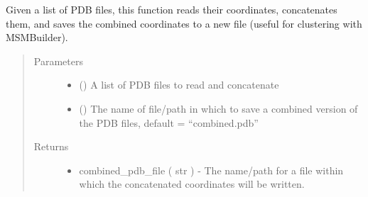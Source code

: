 \documentclass[letterpaper,12pt,english,openany,oneside]{sphinxmanual}
\begin{document}
\begin{fulllineitems}
\label{\detokenize{ensembles:ensembles.cluster.concatenate_trajectories}}
Given a list of PDB files, this function reads their coordinates, concatenates them, and saves the combined coordinates to a new file (useful for clustering with MSMBuilder).
\begin{quote}\begin{description}
\item[{Parameters}] \leavevmode\begin{itemize}
\item {} 
 (\sphinxstyleliteralemphasis{\sphinxupquote{( }}\sphinxstyleliteralemphasis{\sphinxupquote{ )}}) \textendash{} A list of PDB files to read and concatenate

\item {} 
 () \textendash{} The name of file/path in which to save a combined version of the PDB files, default = “combined.pdb”

\end{itemize}

\item[{Returns}] \leavevmode
\begin{itemize}
\item {} 
combined\_pdb\_file ( str ) - The name/path for a file within which the concatenated coordinates will be written.

\end{itemize}


\end{description}\end{quote}

\end{fulllineitems}

\end{document}
